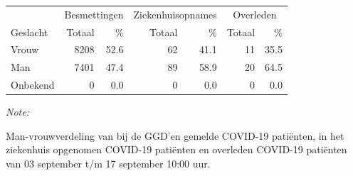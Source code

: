 \documentclass[
  english,
  man,floatsintext]{apa6}
\begin{document}
\begin{table}[H]
\centering\begingroup\fontsize{11}{13}\selectfont

\begin{threeparttable}
\begin{tabular}{lrrrrrr}
\toprule
\multicolumn{1}{c}{ } & \multicolumn{2}{c}{Besmettingen} & \multicolumn{2}{c}{Ziekenhuisopnames} & \multicolumn{2}{c}{Overleden} \\
\cmidrule(l{3pt}r{3pt}){2-3} \cmidrule(l{3pt}r{3pt}){4-5} \cmidrule(l{3pt}r{3pt}){6-7}
Geslacht & Totaal & \% & Totaal & \% & Totaal & \%\\
\midrule
Vrouw & 8208 & 52.6 & 62 & 41.1 & 11 & 35.5\\
Man & 7401 & 47.4 & 89 & 58.9 & 20 & 64.5\\
Onbekend & 0 & 0.0 & 0 & 0.0 & 0 & 0.0\\
\bottomrule
\end{tabular}
\begin{tablenotes}
\item \textit{Note: } 
\item Man-vrouwverdeling van bij de GGD’en gemelde COVID-19 patiënten, in het ziekenhuis opgenomen COVID-19 patiënten en overleden COVID-19 patiënten van 03 september t/m 17 september 10:00 uur.
\end{tablenotes}
\end{threeparttable}
\endgroup{}
\end{table}
\newpage
\end{document}
